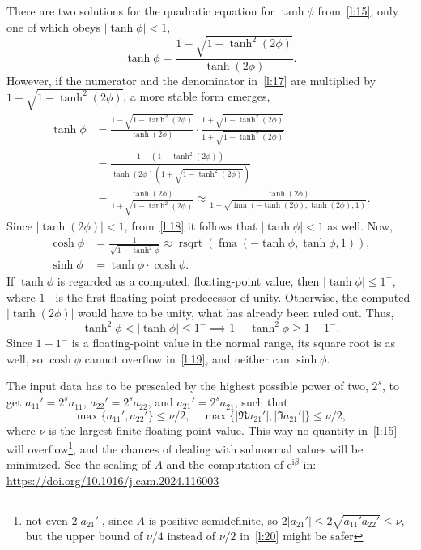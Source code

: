 \documentclass[a4paper,12pt,twoside]{article}
\begin{document}
There are two solutions for the quadratic equation for $\tanh\phi$
from~\eqref{l:15}, only one of which obeys $|\tanh\phi|<1$,
\begin{equation}
  \tanh\phi=\frac{1-\sqrt{1-\tanh^2(2\phi)}}{\tanh(2\phi)}.
  \label{l:17}
\end{equation}
However, if the numerator and the denominator in~\eqref{l:17} are
multiplied by $1+\sqrt{1-\tanh^2(2\phi)}$, a more stable form emerges,
\begin{equation}
  \begin{aligned}
    \tanh\phi&=\frac{1-\sqrt{1-\tanh^2(2\phi)}}{\tanh(2\phi)}\cdot\frac{1+\sqrt{1-\tanh^2(2\phi)}}{1+\sqrt{1-\tanh^2(2\phi)}}\\
    &=\frac{1-(1-\tanh^2(2\phi))}{\tanh(2\phi)\left(1+\sqrt{1-\tanh^2(2\phi)}\right)}\\
    &=\frac{\tanh(2\phi)}{1+\sqrt{1-\tanh^2(2\phi)}}\approx\frac{\tanh(2\phi)}{1+\sqrt{\mathop{\mathrm{fma}}(-\tanh(2\phi),\tanh(2\phi),1)}}.
  \end{aligned}
  \label{l:18}
\end{equation}
Since $|\tanh(2\phi)|<1$, from~\eqref{l:18} it follows that
$|\tanh\phi|<1$ as well.  Now,
\begin{equation}
  \begin{aligned}
    \cosh\phi&=\frac{1}{\sqrt{1-\tanh^2\phi}}\approx\mathop{\mathrm{rsqrt}}(\mathop{\mathrm{fma}}(-\tanh\phi,\tanh\phi,1)),\\
    \sinh\phi&=\tanh\phi\cdot\cosh\phi.
  \end{aligned}
  \label{l:19}
\end{equation}
If $\tanh\phi$ is regarded as a computed, floating-point value, then
$|\tanh\phi|\le 1^-$,\\where $1^-$ is the first floating-point
predecessor of unity.  Otherwise, the computed $|\tanh(2\phi)|$ would
have to be unity, what has already been ruled out.  Thus,
\begin{displaymath}
  \tanh^2\phi<|\tanh\phi|\le 1^-\implies 1-\tanh^2\phi\ge 1-1^-.
\end{displaymath}
Since $1-1^-$ is a floating-point value in the normal range, its
square root is as well, so $\cosh\phi$ cannot overflow
in~\eqref{l:19}, and neither can $\sinh\phi$.

The input data has to be prescaled by the highest possible power of
two, $2^s$, to get $a_{11}'=2^s a_{11}^{}$, $a_{22}'=2^s a_{22}^{}$,
and $a_{21}'=2^s a_{21}^{}$, such that
\begin{equation}
  \max\{a_{11}',a_{22}'\}\le\nu/2,\quad
  \max\{|\Re{a_{21}'}|,|\Im{a_{21}'}|\}\le\nu/2,
  \label{l:20}
\end{equation}
where $\nu$ is the largest finite floating-point value.  This way no
quantity in~\eqref{l:15} will overflow\footnote{not even $2|a_{21}'|$,
since $A$ is positive semidefinite, so
$2|a_{21}'|\le 2\sqrt{a_{11}'a_{22}'}\le\nu$, but the upper bound of
$\nu/4$ instead of $\nu/2$ in~\eqref{l:20} might be safer}, and the
chances of dealing with subnormal values will be minimized.  See the
scaling of $A$ and the computation of $\mathrm{e}^{\mathrm{i}\beta}$
in:\\\url{https://doi.org/10.1016/j.cam.2024.116003}
\end{document}
